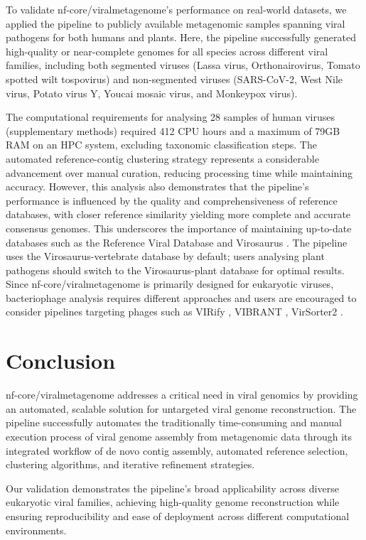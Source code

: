 To validate nf-core/viralmetagenome's performance on real-world datasets, we applied the pipeline to publicly available metagenomic samples spanning viral pathogens for both humans and plants. Here, the pipeline successfully generated high-quality or near-complete genomes for all species across different viral families, including both segmented viruses (Lassa virus, Orthonairovirus, Tomato spotted wilt tospovirus) and non-segmented viruses (SARS-CoV-2, West Nile virus, Potato virus Y, Youcai mosaic virus,  and Monkeypox virus).

The computational requirements for analysing 28 samples of human viruses (supplementary methods) required 412 CPU hours and a maximum of 79GB RAM on an HPC system, excluding taxonomic classification steps. The automated reference-contig clustering strategy represents a considerable advancement over manual curation, reducing processing time while maintaining accuracy. However, this analysis also demonstrates that the pipeline's performance is influenced by the quality and comprehensiveness of reference databases, with closer reference similarity yielding more complete and accurate consensus genomes. This underscores the importance of maintaining up-to-date databases such as the Reference Viral Database \cite{Goodacre2018-dw} and Virosaurus \cite{Gleizes2020-rq}. The pipeline uses the Virosaurus-vertebrate database by default; users analysing plant pathogens should switch to the Virosaurus-plant database for optimal results. Since nf-core/viralmetagenome is primarily designed for eukaryotic viruses, bacteriophage analysis requires different approaches and users are encouraged to consider pipelines targeting phages such as VIRify \cite{Rangel-Pineros2022-wv}, VIBRANT \cite{Kieft2020-aq}, VirSorter2 \cite{Guo2021-rf}.


\section{Conclusion}

nf-core/viralmetagenome addresses a critical need in viral genomics by providing an automated, scalable solution for untargeted viral genome reconstruction. The pipeline successfully automates the traditionally time-consuming and manual execution process of viral genome assembly from metagenomic data through its integrated workflow of de novo contig assembly, automated reference selection, clustering algorithms, and iterative refinement strategies.

Our validation demonstrates the pipeline's broad applicability across diverse eukaryotic viral families, achieving high-quality genome reconstruction while ensuring reproducibility and ease of deployment across different computational environments.

